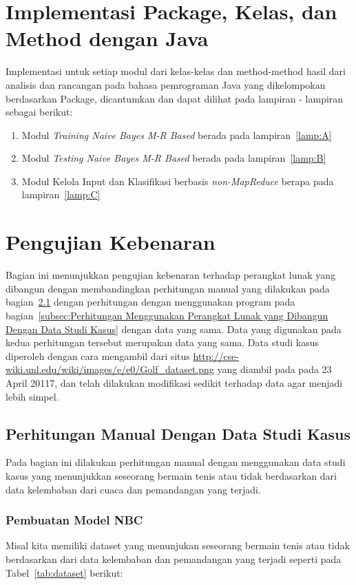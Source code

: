 \section{Implementasi Package, Kelas, dan Method dengan Java}
\label{sec:impl_code}

Implementasi untuk setiap modul dari kelas-kelas dan method-method hasil dari analisis dan rancangan pada bahasa pemrograman Java yang dikelompokan berdasarkan Package, dicantumkan dan dapat dilihat pada lampiran - lampiran sebagai berikut:
\begin{enumerate}
	\item Modul \textit{Training Naive Bayes M-R Based} berada pada lampiran~\ref{lamp:A}
	\item Modul \textit{Testing Naive Bayes M-R Based} berada pada lampiran~\ref{lamp:B}
	\item Modul Kelola Input dan Klasifikasi berbasis \textit{non-MapReduce} berapa pada lampiran~\ref{lamp:C}
\end{enumerate}

\section{Pengujian Kebenaran}
Bagian ini menunjukkan pengujian kebenaran terhadap perangkat lunak yang dibangun dengan membandingkan perhitungan manual yang dilakukan pada bagian~\ref{subsec:Perhitungan Manual Dengan Data Studi Kasus} dengan perhitungan dengan menggunakan program pada bagian~\ref{subsec:Perhitungan Menggunakan Perangkat Lunak yang Dibangun Dengan Data Studi Kasus} dengan data yang sama. Data yang digunakan pada kedua perhitungan tersebut merupakan data yang sama. Data studi kasus diperoleh dengan cara mengambil dari situs \url{http://cse-wiki.unl.edu/wiki/images/e/e0/Golf_dataset.png} yang diambil pada pada 23 April 20117, dan telah dilakukan modifikasi sedikit terhadap data agar menjadi lebih simpel.

\subsection{Perhitungan Manual Dengan Data Studi Kasus}
\label{subsec:Perhitungan Manual Dengan Data Studi Kasus}
Pada bagian ini dilakukan perhitungan manual dengan menggunakan data studi kasus yang menunjukkan seseorang bermain tenis atau tidak berdasarkan dari data kelembaban dari cuaca dan pemandangan yang terjadi.

\subsubsection{Pembuatan Model NBC}
Misal kita memiliki dataset yang menunjukan seseorang bermain tenis atau tidak berdasarkan dari data kelembaban dan pemandangan yang terjadi seperti pada Tabel~\ref{tab:dataset} berikut: 
		
